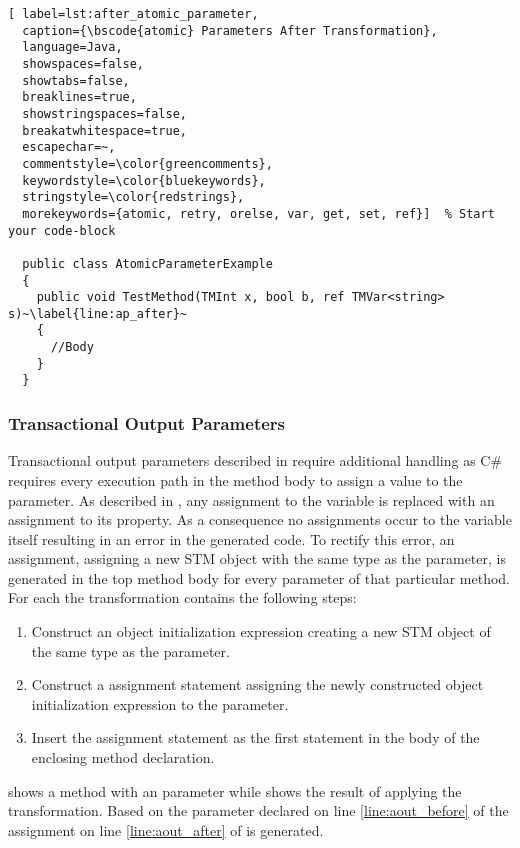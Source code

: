 \begin{lstlisting}[ label=lst:after_atomic_parameter,
  caption={\bscode{atomic} Parameters After Transformation},
  language=Java,  
  showspaces=false,
  showtabs=false,
  breaklines=true,
  showstringspaces=false,
  breakatwhitespace=true,
  escapechar=~,
  commentstyle=\color{greencomments},
  keywordstyle=\color{bluekeywords},
  stringstyle=\color{redstrings},
  morekeywords={atomic, retry, orelse, var, get, set, ref}]  % Start your code-block

  public class AtomicParameterExample
  {
    public void TestMethod(TMInt x, bool b, ref TMVar<string> s)~\label{line:ap_after}~
    {
      //Body
    }
  }
\end{lstlisting}


\subsubsection{Transactional Output Parameters}
Transactional output parameters described in  require additional handling as C\# requires every execution path in the method body to assign a value to the parameter\cite[p. 42]{sestoft2011c}. As described in , any assignment to the variable is replaced with an assignment to its  property. As a consequence no assignments occur to the variable itself resulting in an error in the generated code. To rectify this error, an assignment, assigning a new \ac{STM} object with the same type as the parameter, is generated in the top method body for every  parameter of that particular method. For each  the \stmnamesp transformation contains the following steps:

\begin{enumerate}
	\item Construct an object initialization expression creating a new \ac{STM} object of the same type as the parameter.
	\item Construct a assignment statement assigning the newly constructed object initialization expression to the  parameter.
	\item Insert the assignment statement as the first statement in the body of the enclosing method declaration.
\end{enumerate}

 shows a method with an  parameter while  shows the result of applying the transformation.
Based on the  parameter declared on line \ref{line:aout_before} of  the assignment on line \ref{line:aout_after} of  is generated.


